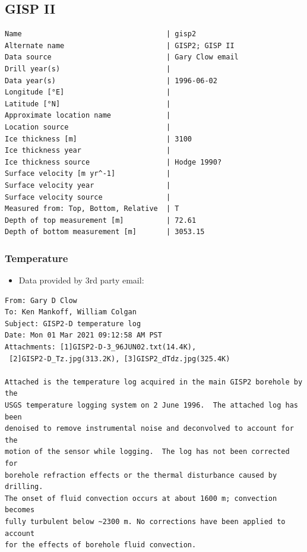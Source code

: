 \documentclass[article,a4paper,times,11pt,twoside]{article}
\begin{document}
\subsection{GISP II}
\label{sec:orgdade470}
\begin{verbatim}
Name                                  | gisp2
Alternate name                        | GISP2; GISP II
Data source                           | Gary Clow email
Drill year(s)                         | 
Data year(s)                          | 1996-06-02
Longitude [°E]                        | 
Latitude [°N]                         | 
Approximate location name             | 
Location source                       | 
Ice thickness [m]                     | 3100
Ice thickness year                    | 
Ice thickness source                  | Hodge 1990?
Surface velocity [m yr^-1]            | 
Surface velocity year                 | 
Surface velocity source               | 
Measured from: Top, Bottom, Relative  | T
Depth of top measurement [m]          | 72.61
Depth of bottom measurement [m]       | 3053.15
\end{verbatim}


\subsubsection{Temperature}
\label{sec:orgc23d4b9}

\begin{itemize}
\item Data provided by 3rd party email:
\end{itemize}

\begin{verbatim}
From: Gary D Clow
To: Ken Mankoff, William Colgan
Subject: GISP2-D temperature log
Date: Mon 01 Mar 2021 09:12:58 AM PST
Attachments: [1]GISP2-D-3_96JUN02.txt(14.4K),
 [2]GISP2-D_Tz.jpg(313.2K), [3]GISP2_dTdz.jpg(325.4K)

Attached is the temperature log acquired in the main GISP2 borehole by the
USGS temperature logging system on 2 June 1996.  The attached log has been
denoised to remove instrumental noise and deconvolved to account for the
motion of the sensor while logging.  The log has not been corrected for
borehole refraction effects or the thermal disturbance caused by drilling.
The onset of fluid convection occurs at about 1600 m; convection becomes
fully turbulent below ~2300 m. No corrections have been applied to account
for the effects of borehole fluid convection.
\end{verbatim}
\end{document}
